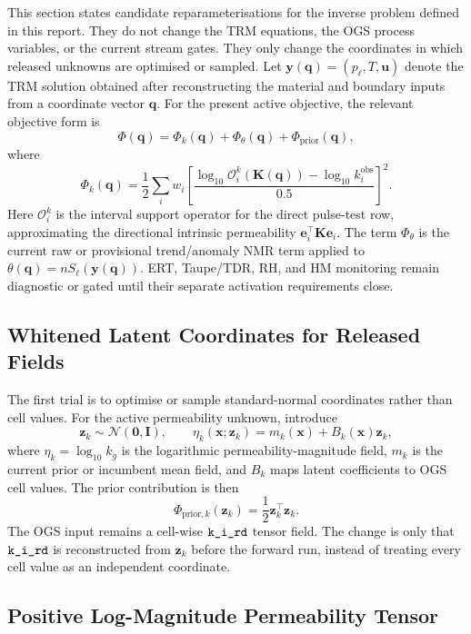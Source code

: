 \documentclass[10pt,a4paper]{article}
\newcommand{\code}[1]{\texttt{\detokenize{#1}}}
\newcommand{\uu}{\bm{u}}
\newcommand{\I}{\bm{I}}
\newcommand{\TT}{T}
\newcommand{\pp}{p_\ell}
\newcommand{\npor}{n}
\newcommand{\Sat}{S_\ell}
\newcommand{\K}{\bm K}
\newcommand{\thetaw}{\theta}
\newcommand{\Oop}{\mathcal O}
\begin{document}
This section states candidate reparameterisations for the inverse problem defined in
this report.  They do not change the TRM equations, the OGS process variables, or
the current stream gates.  They only change the coordinates in which released
unknowns are optimised or sampled.  Let \(\bm y(\bm q)=(\pp,\TT,\uu)\) denote the
TRM solution obtained after reconstructing the material and boundary inputs from a
coordinate vector \(\bm q\).  For the present active objective, the relevant
objective form is
\[
\Phi(\bm q)=\Phi_k(\bm q)+\Phi_\theta(\bm q)+\Phi_{\mathrm{prior}}(\bm q),
\]
where
\[
\Phi_k(\bm q)=\frac12\sum_i w_i
\left[
\frac{\log_{10}\Oop_i^k(\K(\bm q))-\log_{10}k^{\mathrm{obs}}_i}
{0.5}
\right]^2 .
\]
Here \(\Oop_i^k\) is the interval support operator for the direct pulse-test row,
approximating the directional intrinsic permeability
\(\bm e_i^\top\K\bm e_i\).  The term \(\Phi_\theta\) is the current raw or
provisional trend/anomaly NMR term applied to
\(\thetaw(\bm q)=\npor\Sat(\bm y(\bm q))\).  ERT, Taupe/TDR, RH, and HM monitoring
remain diagnostic or gated until their separate activation requirements close.

\subsection{Whitened Latent Coordinates for Released Fields}

The first trial is to optimise or sample standard-normal coordinates rather than
cell values.  For the active permeability unknown, introduce
\[
  \bm z_k\sim\mathcal N(\bm{0},\I), \qquad
  \eta_k(\bm x;\bm z_k)=m_k(\bm x)+B_k(\bm x)\bm z_k ,
\]
where \(\eta_k=\log_{10}k_g\) is the logarithmic permeability-magnitude field,
\(m_k\) is the current prior or incumbent mean field, and \(B_k\) maps latent
coefficients to OGS cell values.  The prior contribution is then
\[
  \Phi_{\mathrm{prior},k}(\bm z_k)=\frac12\bm z_k^\top\bm z_k .
\]
The OGS input remains a cell-wise \(\code{k_i_rd}\) tensor field.  The change is
only that \(\code{k_i_rd}\) is reconstructed from \(\bm z_k\) before the forward
run, instead of treating every cell value as an independent coordinate.

\subsection{Positive Log-Magnitude Permeability Tensor}
\end{document}
